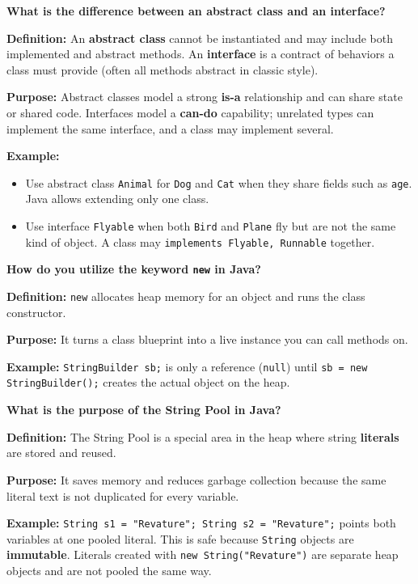 \question[0]
\textbf{What is the difference between an abstract class and an interface?}

\textbf{Definition:} An \textbf{abstract class} cannot be instantiated and may include both implemented and abstract methods. An \textbf{interface} is a contract of behaviors a class must provide (often all methods abstract in classic style).

\textbf{Purpose:} Abstract classes model a strong \textbf{is-a} relationship and can share state or shared code. Interfaces model a \textbf{can-do} capability; unrelated types can implement the same interface, and a class may implement several.

\textbf{Example:}
\begin{itemize}
  \item Use abstract class \texttt{Animal} for \texttt{Dog} and \texttt{Cat} when they share fields such as \texttt{age}. Java allows extending only one class.
  \item Use interface \texttt{Flyable} when both \texttt{Bird} and \texttt{Plane} fly but are not the same kind of object. A class may \texttt{implements Flyable, Runnable} together.
\end{itemize}

\question[0]
\textbf{How do you utilize the keyword \texttt{new} in Java?}

\textbf{Definition:} \texttt{new} allocates heap memory for an object and runs the class constructor.

\textbf{Purpose:} It turns a class blueprint into a live instance you can call methods on.

\textbf{Example:} \texttt{StringBuilder sb;} is only a reference (\texttt{null}) until \texttt{sb = new StringBuilder();} creates the actual object on the heap.

\question[0]
\textbf{What is the purpose of the String Pool in Java?}

\textbf{Definition:} The String Pool is a special area in the heap where string \textbf{literals} are stored and reused.

\textbf{Purpose:} It saves memory and reduces garbage collection because the same literal text is not duplicated for every variable.

\textbf{Example:} \texttt{String s1 = "Revature"; String s2 = "Revature";} points both variables at one pooled literal. This is safe because \texttt{String} objects are \textbf{immutable}. Literals created with \texttt{new String("Revature")} are separate heap objects and are not pooled the same way.

